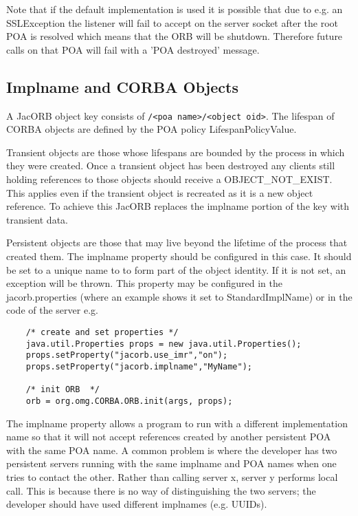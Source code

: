 Note that if the default implementation is used it is possible that due to e.g.
an SSLException the listener will fail to accept on the server socket after the
root POA is resolved which means that the ORB will be shutdown. Therefore future
calls on that POA will fail with a 'POA destroyed' message.

\subsection{Implname and CORBA Objects}
\label{implname}
A JacORB object key consists of {\tt <impl name>/<poa name>/<object oid>}. The lifespan of CORBA objects are defined by the POA policy LifespanPolicyValue.

Transient objects are those whose lifespans are bounded by the process in which they were created. Once a transient object has been destroyed any clients still holding references to those objects should receive a OBJECT\_NOT\_EXIST. This applies even if the transient object is recreated as it is a new object reference. To achieve this JacORB replaces the implname portion of the key with transient data.

Persistent objects are those that may live beyond the lifetime of the process that created them. The implname property should be configured in this case. It should be set to a unique name to to form part of the object identity. If it is not set, an exception will be thrown. This property may be configured in the jacorb.properties (where an example shows it set to StandardImplName) or in the code of the server e.g.
\small{
\begin{verbatim}
    /* create and set properties */
    java.util.Properties props = new java.util.Properties();
    props.setProperty("jacorb.use_imr","on");
    props.setProperty("jacorb.implname","MyName");

    /* init ORB  */
    orb = org.omg.CORBA.ORB.init(args, props);
\end{verbatim}
}

The implname property allows a program to run with a different implementation name so that it will not accept references created by another persistent POA with the same POA name. A common problem is where the developer has two persistent servers running with the same implname and POA names when one tries to contact the other. Rather than calling server x, server y performs local call. This is because there is no way of distinguishing the two servers; the developer should have used different implnames (e.g. UUIDs).

